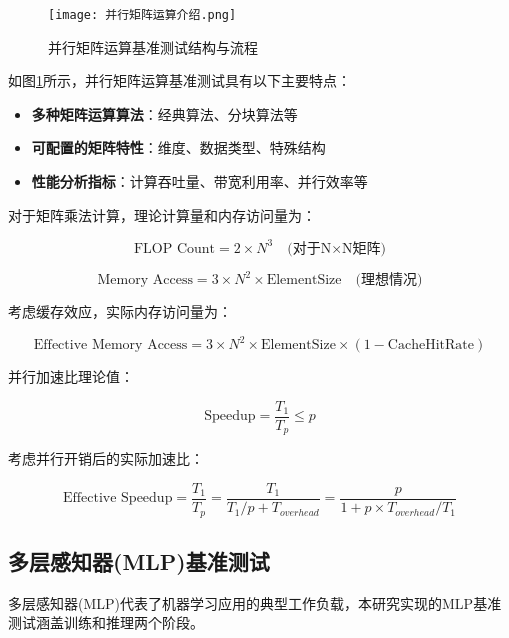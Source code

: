 \documentclass[bachelor]{thesis-uestc}
\begin{document}
\begin{figure}[htbp]
    \centering
    \texttt{[image: 并行矩阵运算介绍.png]}
    \caption{并行矩阵运算基准测试结构与流程}
    \label{fig:matrix_benchmark}
\end{figure}

如图\ref{fig:matrix_benchmark}所示，并行矩阵运算基准测试具有以下主要特点：

\begin{itemize}
    \item \textbf{多种矩阵运算算法}：经典算法、分块算法等
    \item \textbf{可配置的矩阵特性}：维度、数据类型、特殊结构
    \item \textbf{性能分析指标}：计算吞吐量、带宽利用率、并行效率等
\end{itemize}

对于矩阵乘法计算，理论计算量和内存访问量为：

\begin{equation}
\text{FLOP Count} = 2 \times N^3 \quad \text{(对于N×N矩阵)}
\end{equation}

\begin{equation}
\text{Memory Access} = 3 \times N^2 \times \text{ElementSize} \quad \text{(理想情况)}
\end{equation}

考虑缓存效应，实际内存访问量为：

\begin{equation}
\text{Effective Memory Access} = 3 \times N^2 \times \text{ElementSize} \times (1 - \text{CacheHitRate})
\end{equation}

并行加速比理论值：

\begin{equation}
\text{Speedup} = \frac{T_1}{T_p} \leq p
\end{equation}

考虑并行开销后的实际加速比：

\begin{equation}
\text{Effective Speedup} = \frac{T_1}{T_p} = \frac{T_1}{T_1/p + T_{overhead}} = \frac{p}{1 + p \times T_{overhead}/T_1}
\end{equation}

\subsection{多层感知器(MLP)基准测试}

多层感知器(MLP)代表了机器学习应用的典型工作负载，本研究实现的MLP基准测试涵盖训练和推理两个阶段。
\end{document}
